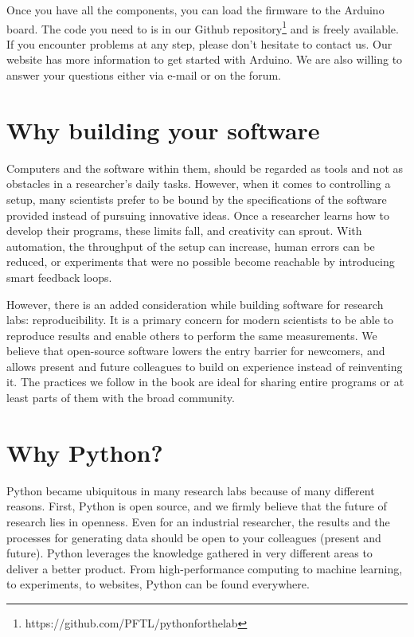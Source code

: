 Once you have all the components, you can load the firmware to the Arduino board. The code you need to is in our Github repository\footnote{https://github.com/PFTL/pythonforthelab} and is freely available. If you encounter problems at any step, please don't hesitate to contact us. Our website has more information to get started with Arduino. We are also willing to answer your questions either via e-mail or on the forum. 

\section{Why building your software}\label{sec:why-building-your-software}
Computers and the software within them, should be regarded as tools and not as obstacles in a researcher's daily tasks. However, when it comes to controlling a setup, many scientists prefer to be bound by the specifications of the software provided instead of pursuing innovative ideas. Once a researcher learns how to develop their programs, these limits fall, and creativity can sprout. With automation, the throughput of the setup can increase, human errors can be reduced, or experiments that were no possible become reachable by introducing smart feedback loops.

However, there is an added consideration while building software for research labs: reproducibility. It is a primary concern for modern scientists to be able to reproduce results and enable others to perform the same measurements. We believe that open-source software lowers the entry barrier for newcomers, and allows present and future colleagues to build on experience instead of reinventing it. The practices we follow in the book are ideal for sharing entire programs or at least parts of them with the broad community.

\section{Why Python?}\label{sec:why-python?}
Python became ubiquitous in many research labs because of many different reasons. First, Python is open source, and we firmly believe that the future of research lies in openness. Even for an industrial researcher, the results and the processes for generating data should be open to your colleagues (present and future). Python leverages the knowledge gathered in very different areas to deliver a better product. From high-performance computing to machine learning, to experiments, to websites, Python can be found everywhere.

